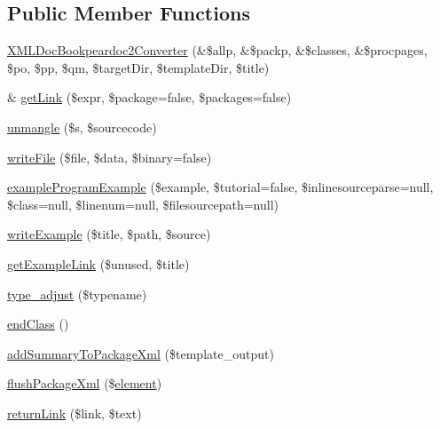 \subsection*{\-Public \-Member \-Functions}
\begin{DoxyCompactItemize}
\item 
\hyperlink{class_x_m_l_doc_bookpeardoc2_converter_acbb15a1db872fde8038e704dd2be7c3f}{\-X\-M\-L\-Doc\-Bookpeardoc2\-Converter} (\&\$allp, \&\$packp, \&\$classes, \&\$procpages, \$po, \$pp, \$qm, \$target\-Dir, \$template\-Dir, \$title)
\item 
\& \hyperlink{class_x_m_l_doc_bookpeardoc2_converter_a345f04cedd6f4707f74d6858ae318da8}{get\-Link} (\$expr, \$package=false, \$packages=false)
\item 
\hyperlink{class_x_m_l_doc_bookpeardoc2_converter_afb9428c43b03027ffc7cffebe39c47a7}{unmangle} (\$s, \$sourcecode)
\item 
\hyperlink{class_x_m_l_doc_bookpeardoc2_converter_afb3d224527ece4c0df49fb93f1b3e032}{write\-File} (\$file, \$data, \$binary=false)
\item 
\hyperlink{class_x_m_l_doc_bookpeardoc2_converter_a90bd929419af790cfba62346436c27a1}{example\-Program\-Example} (\$example, \$tutorial=false, \$inlinesourceparse=null, \$class=null, \$linenum=null, \$filesourcepath=null)
\item 
\hyperlink{class_x_m_l_doc_bookpeardoc2_converter_a757f70385404e298a4c053d6b7d1be28}{write\-Example} (\$title, \$path, \$source)
\item 
\hyperlink{class_x_m_l_doc_bookpeardoc2_converter_a7bddb64c5725cf89468ecd00da19cbb4}{get\-Example\-Link} (\$unused, \$title)
\item 
\hyperlink{class_x_m_l_doc_bookpeardoc2_converter_af92d383cc0eaed9523b706b2fbf9dbb3}{type\-\_\-adjust} (\$typename)
\item 
\hyperlink{class_x_m_l_doc_bookpeardoc2_converter_ae4962a5674fd1be0f3795cb72f2974bf}{end\-Class} ()
\item 
\hyperlink{class_x_m_l_doc_bookpeardoc2_converter_aa6a51e40e9873a94d12ae26ceeea7ebc}{add\-Summary\-To\-Package\-Xml} (\$template\-\_\-output)
\item 
\hyperlink{class_x_m_l_doc_bookpeardoc2_converter_a9457a159dc09a3bb50d44b0091e75c9b}{flush\-Package\-Xml} (\$\hyperlink{bug-904820_8php_aa94081298ab2dfd0f261cce6c203d9aa}{element})
\item 
\hyperlink{class_x_m_l_doc_bookpeardoc2_converter_af40fcd39ab514ae82e555a451dd72dc2}{return\-Link} (\$link, \$text)
\item 

\end{DoxyCompactItemize}

